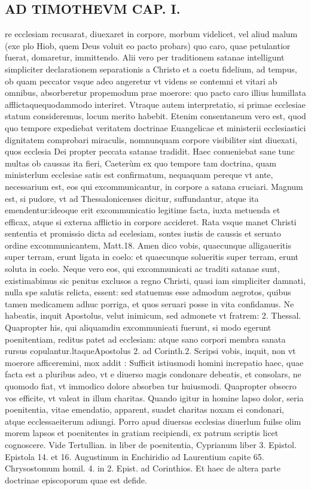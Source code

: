 \documentclass{article}
\begin{document}
\begin{pages}
\section*{AD TIMOTHEVM CAP. I. }
\marginpar{[ p.63 ]}\pstart re ecclesiam recusarat, diuexaret in corpore, morbum videlicet, vel aliud malum (exe plo Hiob, quem Deus voluit eo pacto probars) quo caro, quae petulantior fuerat, domaretur, immittendo. Alii vero per traditionem satanae intelligunt simpliciter declarationem separationis a Christo et a coetu fidelium, ad tempus, ob quam peccator vsque  adeo angeretur vt videns se contemni et vitari ab omnibus, absorberetur propemodum prae moerore: quo pacto caro illius humillata afflictaquequodammodo interiret. Vtraque  autem interpretatio, si primae ecclesiae statum consideremus, locum merito habebit. Etenim consentaneum vero est, quod quo tempore expediebat veritatem doctrinae Euangelicae et ministerii ecclesiastici dignitatem comprobari miraculis, nomnunquam corpore visibiliter sint diuexati, quos ecclesia Dei propter peccata satanae tradidit. Haec conueniebat sane tunc multas ob caussas ita fieri, Caeterùm ex quo tempore tam doctrina, quam ministerlum ecclesiae satis est confirmatum, nequaquam pereque vt ante, necessarium est, eos qui excommunicantur, in corpore a satana cruciari. Magnum est, si pudore, vt ad Thessalonicenses dicitur, suffundantur, atque ita emendentur:ideoque erit excommunicatio legitime facta, iuxta metuenda et efficax, atque si externa afflictio in corpore accideret. Rata vsque  manet Christi sententia et promissio dicta ad ecelesiam, sontes iustis de caussis et seruato ordine excommunicantem, Matt.18. Amen dico vobis, quaecunque  alligaueritis super terram, erunt ligata in coelo: et quaecunque  solueritis super terram, erunt soluta in coelo. Neque  vero eos, qui excommunicati ac traditi satanae sunt, existimabimus sic penitus exclusos a regno Christi, quasi iam simpliciter damnati, nulla spe salutis relicta, essent: sed statuemus esse admodum aegrotos, quibus tamen medicamem adhuc porriga, et quos seruari posse in vita confidamus. Ne habeatis, inquit Apostolus, velut inimicum, sed admonete vt fratrem: 2. Thessal. Quapropter his, qui aliquamdiu excommunieati fuerunt, si modo egerunt poenitentiam, reditus patet ad ecclesiam: atque  sano corpori membra sanata rursus copulantur.ltaqueApostolus 2. ad Corinth.2. Scripsi vobis, inquit, non vt moerore afficeremini, mox addit : Sufficit istiusmodi homini increpatio haec, quae facta est a pluribus  adeo, vt e diuerso magis condonare debeatis, et consolars, ne quomodo fiat, vt immodico dolore absorbea tur huiusmodi. Quapropter obsecro vos efficite, vt valeat in illum charitas. Quando igitur in homine lapso dolor, seria poenitentia, vitae emendatio, apparent, suadet charitas noxam ei condonari, atque  ecclessaeiterum adiungi. Porro apud diuersas ecclesias diuerlum fuilse olim morem lapsos et poenitentes in gratiam recipiendi, ex patrum scriptis licet cognoscere. Vide Tertullian. in liber  de poenitentia, Cyprianum liber  3. Epistol. Epistola 14. et 16. Augustinum in Enchiridio ad Laurentium capite 65. Chrysostomum homil. 4. in 2. Epist. ad Corinthios. Et haec de altera parte doctrinae episcoporum quae est defide.  \pend

\end{pages}
\end{document}

